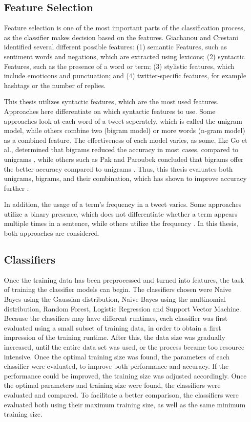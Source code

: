 \subsection{Feature Selection}
Feature selection is one of the most important parts of the classification process, as the classifier makes decision based on the features. Giachanou and Crestani identified several different possible features: (1) semantic Features, such as sentiment words and negations, which are extracted using lexicons; (2) syntactic Features, such as the presence of a word or term; (3) stylistic features, which include emoticons and punctuation; and (4) twitter-specific features, for example hashtags or the number of replies.

This thesis utilizes syntactic features, which are the most used features. Approaches here differentiate on which syntactic features to use. Some approaches look at each word of a tweet seperately, which is called the unigram model, while others combine two (bigram model) or more words (n-gram model) as a combined feature. The effectiveness of each model varies, as some, like Go et al., determined that bigrams reduced the accuracy in most cases, compared to unigrams \cite{GoBHaHua2009}, while others such as Pak and Paroubek concluded that bigrams offer the better accuracy compared to unigrams \cite{pak}. Thus, this thesis evaluates both unigrams, bigrams, and their combination, which has shown to improve accuracy further \cite{GoBHaHua2009}.

In addition, the usage of a term's frequency in a tweet varies. Some approaches utilize a binary presence, which does not differentiate whether a term appears multiple times in a sentence, while others utilize the frequency \cite{DBLP:journals/csur/GiachanouC16}. In this thesis, both approaches are considered.

\subsection{Classifiers}

Once the training data has been preprocessed and turned into features, the task of training the classifier models can begin. The classifiers chosen were Naive Bayes using the Gaussian distribution, Naive Bayes using the multinomial distribution, Random Forest, Logistic Regression and Support Vector Machine. Because the classifiers may have different runtimes, each classifier was first evaluated using a small subset of training data, in order to obtain a first impression of the training runtime. After this, the data size was gradually increased, until the entire data set was used, or the process became too resource intensive. Once the optimal training size was found, the parameters of each classifier were evaluated, to improve both performance and accuracy. If the performance could be improved, the training size was adjusted accordingly. Once the optimal parameters and training size were found, the classifiers were evaluated and compared. To facilitate a better comparison, the classifiers were evaluated both using their maximum training size, as well as the same minimum training size.

